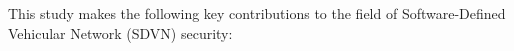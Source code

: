 This study makes the following key contributions to the field of Software-Defined Vehicular Network (SDVN) security:

